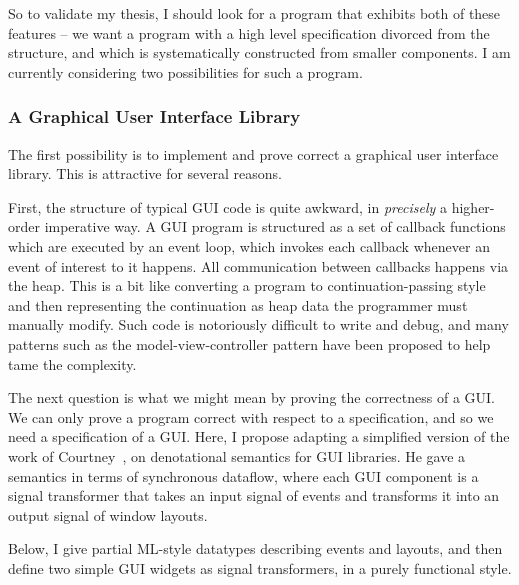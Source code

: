 So to validate my thesis, I should look for a program that exhibits
both of these features -- we want a program with a high level
specification divorced from the structure, and which is systematically
constructed from smaller components. I am currently considering two
possibilities for such a program.

\subsubsection{A Graphical User Interface Library}

The first possibility is to implement and prove correct a graphical
user interface library. This is attractive for several reasons.

First, the structure of typical GUI code is quite awkward, in
\emph{precisely} a higher-order imperative way. A GUI program is
structured as a set of callback functions which are executed by an
event loop, which invokes each callback whenever an event of interest
to it happens. All communication between callbacks happens via the
heap. This is a bit like converting a program to continuation-passing
style and then representing the continuation as heap data the
programmer must manually modify. Such code is notoriously difficult to
write and debug, and many patterns such as the model-view-controller
pattern have been proposed to help tame the complexity.

The next question is what we might mean by proving the correctness of
a GUI. We can only prove a program correct with respect to a
specification, and so we need a specification of a GUI. Here, I
propose adapting a simplified version of the work of
Courtney~\cite{courtney-fruit}, on denotational semantics for GUI
libraries. He gave a semantics in terms of synchronous dataflow, where
each GUI component is a signal transformer that takes an input signal
of events and transforms it into an output signal of window layouts.

Below, I give partial ML-style datatypes describing events and
layouts, and then define two simple GUI widgets as signal
transformers, in a purely functional style.

